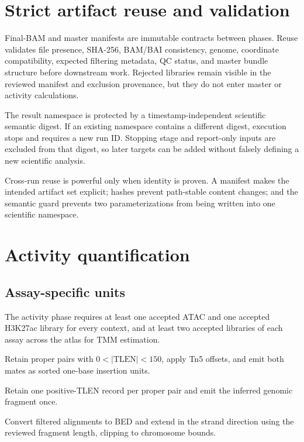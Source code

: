\documentclass[11pt]{article}
\newcommand{\filep}[1]{\path{#1}}
\begin{document}
\section{Strict artifact reuse and validation}

Final-BAM and master manifests are immutable contracts between phases.  Reuse
validates file presence, SHA-256, BAM/BAI consistency, genome, coordinate
compatibility, expected filtering metadata, QC status, and master bundle
structure before downstream work.  Rejected libraries remain visible in the
reviewed manifest and exclusion provenance, but they do not enter master or
activity calculations.

The result namespace \filep{results/<project>/<run_id>} is protected by a
timestamp-independent scientific semantic digest.  If an existing namespace
contains a different digest, execution stops and requires a new run ID.
Stopping stage and report-only inputs are excluded from that digest, so later
targets can be added without falsely defining a new scientific analysis.

Cross-run reuse is powerful only when identity is proven.  A manifest makes
the intended artifact set explicit; hashes prevent path-stable content changes;
and the semantic guard prevents two parameterizations from being written into
one scientific namespace.

\section{Activity quantification}
\label{sec:quantification}

\subsection{Assay-specific units}

The activity phase requires at least one accepted ATAC and one accepted
H3K27ac library for every context, and at least two accepted libraries of each
assay across the atlas for TMM estimation.

\begin{description}[style=nextline,leftmargin=2.2em]
  \item[Paired-end ATAC]
  Retain proper pairs with \(0 < |\mathrm{TLEN}| < 150\), apply Tn5 offsets,
  and emit both mates as sorted one-base insertion units.

  \item[Paired-end H3K27ac]
  Retain one positive-TLEN record per proper pair and emit the inferred genomic
  fragment once.

  \item[Single-end H3K27ac]
  Convert filtered alignments to BED and extend in the strand direction using
  the reviewed fragment length, clipping to chromosome bounds.
\end{description}
\end{document}
